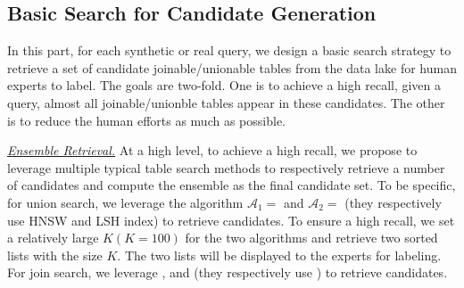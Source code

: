%


 



\subsection{Basic Search for Candidate Generation}
In this part, for each synthetic or real query, we design a basic search strategy to retrieve a set of  candidate joinable/unionable tables from the data lake for human experts to label. The goals are two-fold. One is to achieve a high recall, \ie given a query, almost all joinable/unionble tables appear in these candidates. The other is to reduce the human efforts as much as possible.

\noindent \underline{\textit{Ensemble Retrieval.}}
At a high level, to achieve a high recall, we propose to leverage multiple typical table search methods to respectively retrieve a number of candidates and compute the ensemble as the final candidate set.  
%
To be specific, for union search, we leverage the algorithm $\mathcal{A}_1=$ \starmie and $\mathcal{A}_2=$ \dlll (they respectively use HNSW and LSH index) to retrieve candidates.
 To ensure a high recall, we set a relatively large $K (K=100)$ for the two algorithms and retrieve two sorted lists with the size $K$.
 The two lists will be displayed to the experts for labeling. 
%
For join search, we leverage \josie, \deepjoin and \starmie (they respectively use ) to retrieve candidates. 


